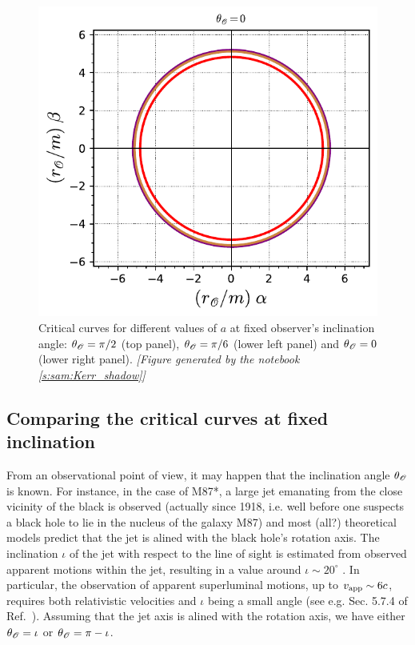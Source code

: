 \begin{figure}
\begin{center}
\includegraphics[height=0.28\textheight]{gik_shadow_comp_th00.pdf}
\end{center}
\caption[]{\label{f:gik:shadow_comp_th} \footnotesize
Critical curves for different values of $a$ at fixed observer's inclination
angle: $\theta_{\mathscr{O}} = \pi/2$ (top panel),   $\theta_{\mathscr{O}} = \pi/6$ (lower left panel)
and $\theta_{\mathscr{O}} = 0$ (lower right panel).
\textsl{[Figure generated by the notebook \ref{s:sam:Kerr_shadow}]}
}
\end{figure}



\subsection{Comparing the critical curves at fixed inclination}

From an observational point of view, it may happen that the inclination angle
$\theta_{\mathscr{O}}$ is known. For instance, in the case of M87*,
a large jet emanating from the close vicinity of the black is observed
(actually since 1918, i.e. well before one suspects a black hole to lie
in the nucleus of the galaxy M87)
and most (all?) theoretical models predict that the jet is alined with
the black hole's rotation axis. The inclination  $\iota$ of the jet with respect to the
line of sight is estimated from observed apparent motions within the jet,
resulting in a value around $\iota \sim 20^\circ$
\cite{MerteLWH16,WalkeHDLJ18}. In particular, the observation of
apparent superluminal motions, up to $v_{\rm app} \sim 6 c$, requires
both relativistic velocities and $\iota$ being a small angle (see e.g. Sec. 5.7.4 of Ref.~\cite{Gourg13}).
Assuming that the jet axis is alined with the rotation axis, we have either
$\theta_{\mathscr{O}} = \iota$ or $\theta_{\mathscr{O}} = \pi - \iota$.

